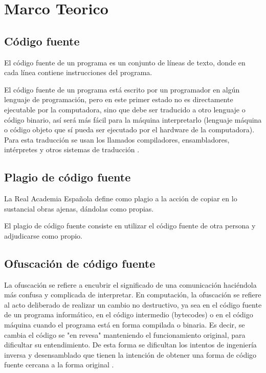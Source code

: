 \chapter{Marco Teorico}

\section{Código fuente}
El código fuente de un programa es un conjunto de líneas de texto, donde en cada línea contiene instrucciones del programa.

El código fuente de un programa está escrito por un programador en algún lenguaje de programación, pero en este primer estado no es directamente ejecutable por la computadora, sino que debe ser traducido a otro lenguaje o código binario, así será más fácil para la máquina interpretarlo (lenguaje máquina o código objeto que sí pueda ser ejecutado por el hardware de la computadora). Para esta traducción se usan los llamados compiladores, ensambladores, intérpretes y otros sistemas de traducción \cite{wiki:Source_Code}.
\section{Plagio de código fuente}
\cite{wiki:Plagiarism} La Real Academia Española define como plagio a la acción de copiar en lo sustancial obras ajenas, dándolas como propias.

El plagio de código fuente consiste en utilizar el código fuente de otra persona y adjudicarse como propio.
\section{Ofuscación de código fuente}
La ofuscación se refiere a encubrir el significado de una comunicación haciéndola más confusa y complicada de interpretar. En computación, la ofuscación se refiere al acto deliberado de realizar un cambio no destructivo, ya sea en el código fuente de un programa informático, en el código intermedio (bytecodes) o en el código máquina cuando el programa está en forma compilada o binaria. Es decir, se cambia el código se "en revesa" manteniendo el funcionamiento original, para dificultar su entendimiento. De esta forma se dificultan los intentos de ingeniería inversa y desensamblado que tienen la intención de obtener una forma de código fuente cercana a la forma original \cite{wiki:Obfuscation_(software)}.

